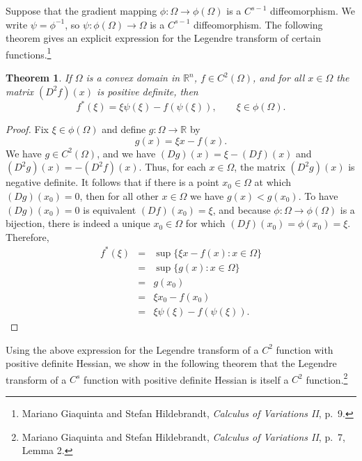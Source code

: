 \documentclass{article}
\newtheorem{theorem}{Theorem}
\theoremstyle{definition}
\begin{document}
Suppose that the gradient mapping $\phi:\Omega \to \phi(\Omega)$ is a $C^{s-1}$ diffeomorphism. We write $\psi=\phi^{-1}$, so $\psi:\phi(\Omega) \to \Omega$
is a $C^{s-1}$ diffeomorphism.
The following theorem gives an explicit expression for the Legendre transform of certain functions.\footnote{Mariano
Giaquinta and Stefan Hildebrandt, {\em Calculus of Variations II}, p.~9.}

\begin{theorem}
If $\Omega$ is a convex domain in $\mathbb{R}^n$, $f \in C^2(\Omega)$, 
and for all $x \in \Omega$ the matrix $(D^2 f)(x)$ is positive definite,
then
\[
f^*(\xi) = \xi  \psi(\xi) -f(\psi(\xi)), \qquad \xi \in \phi(\Omega).
\]
\label{legendreformula}
\end{theorem}
\begin{proof}
Fix $\xi \in \phi(\Omega)$ and define $g:\Omega \to \mathbb{R}$ by 
\[
g(x) = \xi x - f(x).
\]
We have $g \in C^2(\Omega)$, and we have $(Dg)(x) = \xi-(Df)(x)$ and $(D^2 g)(x) = -(D^2 f)(x)$. Thus, for each $x \in
\Omega$, the matrix
$(D^2 g)(x)$ is negative definite. It follows that if there is a point $x_0 \in \Omega$ at which
$(Dg)(x_0)=0$, then for all other $x \in \Omega$ we have $g(x) < g(x_0)$. To have $(Dg)(x_0)=0$ is equivalent
$(Df)(x_0)=\xi$, and because $\phi:\Omega \to \phi(\Omega)$ is a bijection, there is indeed a unique
$x_0 \in \Omega$ for which $(Df)(x_0)=\phi(x_0)=\xi$. Therefore,
\begin{eqnarray*}
f^*(\xi) &=& \sup\{\xi x-f(x): x \in \Omega\} \\
&=&\sup\{g(x):x \in \Omega\} \\
&=& g(x_0)\\
&=&\xi x_0-f(x_0)\\
&=&\xi \psi(\xi) - f(\psi(\xi)).
\end{eqnarray*}
\end{proof}



Using the above expression for the Legendre transform of a $C^2$ function with positive definite Hessian,
we show in the following theorem that the Legendre transform of a $C^s$ function with positive definite Hessian is itself a $C^2$ function.\footnote{Mariano
Giaquinta and Stefan Hildebrandt, {\em Calculus of Variations II}, p.~7, Lemma 2.}
\end{document}

